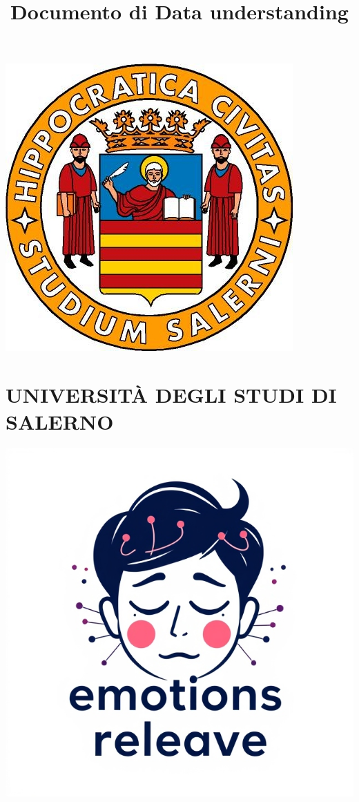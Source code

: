 \documentclass{article}
\title{Documento di Data understanding}
\author{}
\date{}
\begin{document}
\begin{center}
\includegraphics[scale = 0.5]{images/unisa}
\vspace{0.5cm}
\section*{\fontsize{20pt}{24pt}\selectfont\textbf{\textcolor[HTML]{808080}{UNIVERSIT\`A DEGLI STUDI DI SALERNO}}}
\vspace{0.5cm}
    \includegraphics[scale = 0.3]{images/logo}


\end{center}
\end{document}
